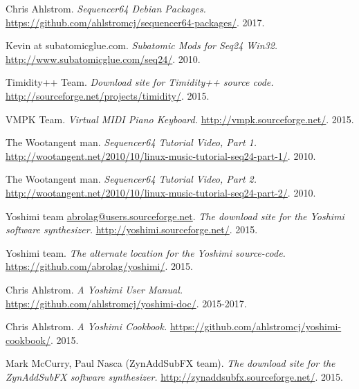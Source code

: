 \begin{thebibliography}{99}
   Chris Ahlstrom.
   \emph{Sequencer64 Debian Packages.}
   \url{https://github.com/ahlstromcj/sequencer64-packages/}.
   2017.

   Kevin at subatomicglue.com.
   \emph{Subatomic Mods for Seq24 Win32.}
   \url{http://www.subatomicglue.com/seq24/}.
   2010.

   Timidity++ Team.
   \emph{Download site for Timidity++ source code.}
   \url{http://sourceforge.net/projects/timidity/}.
   2015.

   VMPK Team.
   \emph{Virtual MIDI Piano Keyboard.}
   \url{http://vmpk.sourceforge.net/}.
   2015.

   The Wootangent man.
   \emph{Sequencer64 Tutorial Video, Part 1.}
   \url{http://wootangent.net/2010/10/linux-music-tutorial-seq24-part-1/}.
   2010.

   The Wootangent man.
   \emph{Sequencer64 Tutorial Video, Part 2.}
   \url{http://wootangent.net/2010/10/linux-music-tutorial-seq24-part-2/}.
   2010.

   Yoshimi team \url{abrolag@users.sourceforge.net}.
   \emph{The download site for the Yoshimi software synthesizer.}
   \url{http://yoshimi.sourceforge.net/}.
   2015.

   Yoshimi team.
   \emph{The alternate location for the Yoshimi source-code.}
   \url{https://github.com/abrolag/yoshimi/}.
   2015.

   Chris Ahlstrom.
   \emph{A Yoshimi User Manual.}
   \url{https://github.com/ahlstromcj/yoshimi-doc/}.
   2015-2017.

   Chris Ahlstrom.
   \emph{A Yoshimi Cookbook.}
   \url{https://github.com/ahlstromcj/yoshimi-cookbook/}.
   2015.

   Mark McCurry, Paul Nasca (ZynAddSubFX team).
   \emph{The download site for the ZynAddSubFX software synthesizer.}
   \url{http://zynaddsubfx.sourceforge.net/}.
   2015.

\end{thebibliography}

